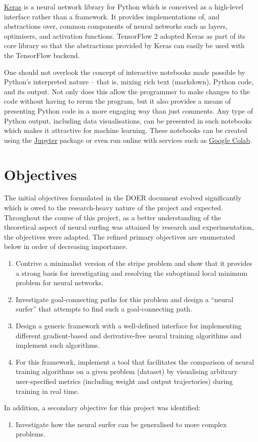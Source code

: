 \href{https://keras.io/}{Keras} is a neural network library for Python which is conceived as a high-level interface rather than a framework. 
It provides implementations of, and abstractions over, common components of neural networks such as layers, optimisers, and activation functions.
TensorFlow 2 adopted Keras as part of its core library so that the abstractions provided by Keras can easily be used with the TensorFlow backend.

One should not overlook the concept of interactive notebooks made possible by Python's interpreted nature -- that is, mixing rich text (markdown), Python code, and its output. 
Not only does this allow the programmer to make changes to the code without having to rerun the program, but it also provides a means of presenting Python code in a more engaging way than just comments.
Any type of Python output, including data visualisations, can be presented in such notebooks which makes it attractive for machine learning.
These notebooks can be created using the \href{https://jupyter.org/}{Jupyter} package or even run online with services such as \href{https://colab.research.google.com/}{Google Colab}. 

\section{Objectives}
\label{sec:objectives}
The initial objectives formulated in the DOER document evolved significantly which is owed to the research-heavy nature of the project and expected.
Throughout the course of this project, as a better understanding of the theoretical aspect of neural surfing was attained by research and experimentation, the objectives were adapted.
The refined primary objectives are enumerated below in order of decreasing importance.
\begin{enumerate}
    \item Contrive a minimalist version of the stripe problem and show that it provides a strong basis for investigating and resolving the suboptimal local minimum problem for neural networks.
    \item Investigate goal-connecting paths for this problem and design a “neural surfer” that attempts to find such a goal-connecting path.
    \item Design a generic framework with a well-defined interface for implementing different gradient-based and derivative-free neural training algorithms and implement such algorithms.
    \item For this framework, implement a tool that facilitates the comparison of neural training algorithms on a given problem (dataset) by visualising arbitrary user-specified metrics (including weight and output trajectories) during training in real time.
\end{enumerate}
In addition, a secondary objective for this project was identified:
\begin{enumerate}[resume]
    \item Investigate how the neural surfer can be generalised to more complex problems.
\end{enumerate}

